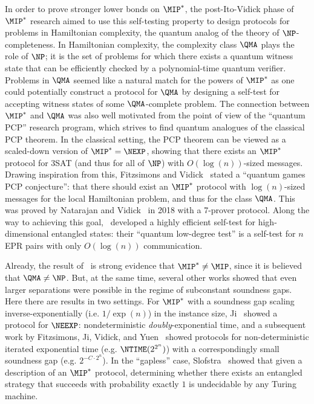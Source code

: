\documentclass[11pt]{article}
\begin{document}
In order to prove stronger lower bonds on $\MIP^*$, the post-Ito-Vidick phase of
$\MIP^*$ research aimed to use this self-testing property to design protocols
for problems in Hamiltonian complexity, the quantum analog of the
theory of $\NP$-completeness. In Hamiltonian complexity, the complexity class
$\QMA$ plays the role of $\NP$; it is the set of problems for which
there exists a quantum witness state that can be efficiently checked
by a polynomial-time quantum verifier. Problems in $\QMA$ seemed like a natural match for
the powers of $\MIP^*$ as one could potentially construct a protocol for $\QMA$ by
designing a self-test for accepting witness states of some $\QMA$-complete
problem. The connection between $\MIP^*$ and $\QMA$ was also well
motivated from the point of view of the ``quantum PCP'' research
program, which strives to find quantum analogues of the classical PCP
theorem. In the classical setting, the PCP theorem can be viewed as a scaled-down
version of $\MIP^* = \NEXP$, showing that there exists an $\MIP^*$
protocol for 3SAT (and thus for all of $\NP$) with $O(\log(n))$-sized
messages. Drawing inspiration from this, Fitzsimons and Vidick~\cite{FV15}
stated a ``quantum games PCP conjecture'': that there should exist an
$\MIP^*$ protocol with $\log(n)$-sized messages for the local
Hamiltonian problem, and thus for the class $\QMA$. This
was proved by Natarajan and Vidick~\cite{NV18a} in 2018 with a 7-prover protocol. Along the way to achieving
this goal,~\cite{NV18a} developed a highly efficient self-test for
high-dimensional entangled states: their ``quantum low-degree test''
is a self-test for $n$ EPR pairs with only $O(\log(n))$ communication.

Already, the result of~\cite{NV18a} is strong evidence that $\MIP^*
\neq \MIP$, since it is believed that $\QMA \neq \NP$. But, at the same
time, several other works showed that even larger separations were
possible in the regime of subconstant soundness gaps. Here there are
results in two settings. For $\MIP^*$ with a soundness gap scaling
inverse-exponentially (i.e. $1/\exp(n)$) in the instance size,
Ji~\cite{Ji17} showed a protocol for $\NEEXP$: nondeterministic
\emph{doubly}-exponential time, and a subsequent work by Fitzsimons,
Ji, Vidick, and Yuen~\cite{FJVY19} showed protocols for
non-deterministic iterated exponential time (e.g. $\NTIME(2^{2^n})$)
with a correspondingly small soundness gap (e.g. $2^{-C \cdot
  2^n}$). In the ``gapless'' case, Slofstra~\cite{Slo16,Slo19} showed that given
a description of an $\MIP^*$ protocol, determining whether there exists an entangled
strategy that succeeds with probability exactly $1$ is undecidable by any Turing machine.
\end{document}
